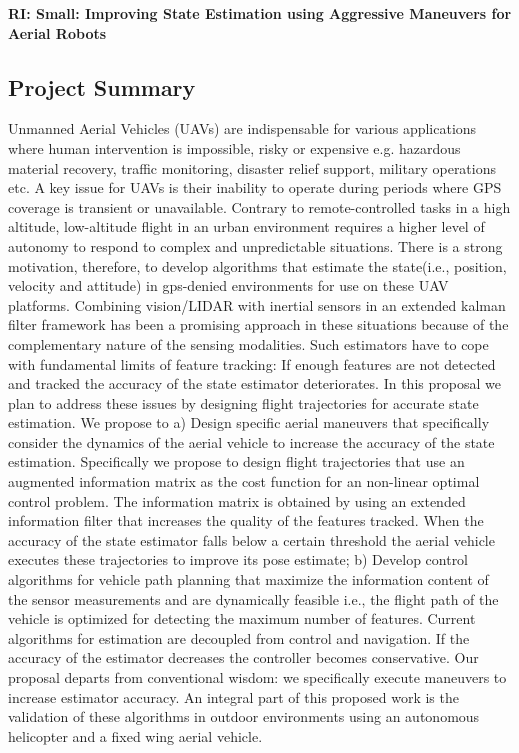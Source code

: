 \begin{center}
  {\large \bf RI: Small: Improving State Estimation using Aggressive Maneuvers for Aerial Robots}
\end{center}
\begin{center}
\section*{Project Summary}
\end{center}

Unmanned Aerial Vehicles (UAVs) are indispensable for various applications where human intervention is impossible, risky or expensive e.g. hazardous material recovery, traffic monitoring, disaster relief support, military operations etc.  A key issue for UAVs is their inability to operate during periods  where GPS coverage is transient or unavailable. Contrary to remote-controlled tasks in a high altitude, low-altitude flight in an urban environment requires a higher level of autonomy to respond to complex and unpredictable situations.  There is a strong motivation, therefore, to develop  algorithms that estimate the state(i.e., position, velocity and attitude) in gps-denied environments for use on these UAV platforms. Combining vision/LIDAR with inertial sensors in an extended kalman filter framework has been a promising approach in these situations because of the complementary nature of the sensing modalities.  Such estimators have to cope with fundamental limits of feature tracking: If enough features are not detected and tracked the accuracy of the state estimator deteriorates. In this proposal we plan to address these issues by designing flight trajectories for accurate state estimation. We propose to a) Design specific aerial maneuvers that specifically consider the dynamics of the aerial vehicle to increase the accuracy of the state estimation. Specifically we propose to design flight trajectories that use an augmented information matrix as the cost function for an non-linear optimal control problem. The information matrix is obtained by using an extended information filter that increases the quality of the features tracked. When the accuracy of the state estimator falls below a certain threshold the aerial vehicle executes these trajectories to improve its  pose estimate; b) Develop control algorithms for vehicle path planning that maximize the information content of the sensor measurements and are dynamically feasible i.e., the flight path of the vehicle is optimized for detecting the maximum number of features. Current algorithms for estimation are decoupled from control and navigation. If the accuracy of the estimator decreases the controller becomes conservative. Our proposal departs from conventional wisdom: we specifically execute maneuvers to increase estimator accuracy. An integral part of this proposed work is the validation of these algorithms in outdoor environments using an autonomous helicopter and a fixed wing aerial vehicle. \\
